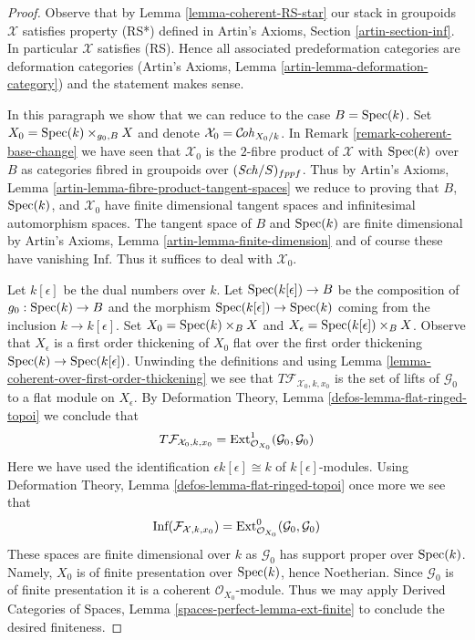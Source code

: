 \begin{proof}
Observe that by Lemma \ref{lemma-coherent-RS-star}
our stack in groupoids $\mathcal{X}$ satisfies property (RS*)
defined in Artin's Axioms, Section \ref{artin-section-inf}.
In particular $\mathcal{X}$ satisfies (RS).
Hence all associated predeformation
categories are deformation categories
(Artin's Axioms, Lemma \ref{artin-lemma-deformation-category})
and the statement makes sense.

\medskip\noindent
In this paragraph we show that we can reduce to the case $B = \mathop{\mathrm{Spec}}(k)$.
Set $X_0 = \mathop{\mathrm{Spec}}(k) \times_{g_0, B} X$
and denote $\mathcal{X}_0 = \mathcal{C}\!\mathit{oh}_{X_0/k}$. In
Remark \ref{remark-coherent-base-change} we have seen that
$\mathcal{X}_0$ is the $2$-fibre product of $\mathcal{X}$ with
$\mathop{\mathrm{Spec}}(k)$ over $B$ as categories fibred in groupoids over
$(\mathit{Sch}/S)_{fppf}$. Thus by
Artin's Axioms, Lemma \ref{artin-lemma-fibre-product-tangent-spaces}
we reduce to proving that $B$, $\mathop{\mathrm{Spec}}(k)$, and $\mathcal{X}_0$
have finite dimensional tangent spaces and infinitesimal automorphism
spaces. The tangent space of $B$ and $\mathop{\mathrm{Spec}}(k)$ are finite dimensional by
Artin's Axioms, Lemma \ref{artin-lemma-finite-dimension}
and of course these have vanishing $\text{Inf}$.
Thus it suffices to deal with $\mathcal{X}_0$.

\medskip\noindent
Let $k[\epsilon]$ be the dual numbers over $k$.
Let $\mathop{\mathrm{Spec}}(k[\epsilon]) \to B$ be the composition of $g_0 : \mathop{\mathrm{Spec}}(k) \to B$
and the morphism $\mathop{\mathrm{Spec}}(k[\epsilon]) \to \mathop{\mathrm{Spec}}(k)$
coming from the inclusion $k \to k[\epsilon]$.
Set $X_0 = \mathop{\mathrm{Spec}}(k) \times_B X$ and
$X_\epsilon = \mathop{\mathrm{Spec}}(k[\epsilon]) \times_B X$.
Observe that $X_\epsilon$ is a first order thickening of $X_0$
flat over the first order thickening $\mathop{\mathrm{Spec}}(k) \to \mathop{\mathrm{Spec}}(k[\epsilon])$.
Unwinding the definitions and using
Lemma \ref{lemma-coherent-over-first-order-thickening}
we see that $T\mathcal{F}_{\mathcal{X}_0, k, x_0}$ is the set of
lifts of $\mathcal{G}_0$ to a flat module on $X_\epsilon$.
By Deformation Theory, Lemma \ref{defos-lemma-flat-ringed-topoi}
we conclude that
$$
T\mathcal{F}_{\mathcal{X}_0, k, x_0} =
\mathop{\mathrm{Ext}}\nolimits^1_{\mathcal{O}_{X_0}}(\mathcal{G}_0, \mathcal{G}_0)
$$
Here we have used the identification $\epsilon k[\epsilon] \cong k$
of $k[\epsilon]$-modules. Using
Deformation Theory, Lemma \ref{defos-lemma-flat-ringed-topoi}
once more we see that
$$
\text{Inf}(\mathcal{F}_{\mathcal{X}, k, x_0}) =
\mathop{\mathrm{Ext}}\nolimits^0_{\mathcal{O}_{X_0}}(\mathcal{G}_0, \mathcal{G}_0)
$$
These spaces are finite dimensional over $k$ as $\mathcal{G}_0$
has support proper over $\mathop{\mathrm{Spec}}(k)$. Namely, $X_0$ is of finite presentation
over $\mathop{\mathrm{Spec}}(k)$, hence Noetherian. Since $\mathcal{G}_0$ is of finite
presentation it is a coherent $\mathcal{O}_{X_0}$-module. Thus we may apply
Derived Categories of Spaces, Lemma
\ref{spaces-perfect-lemma-ext-finite}
to conclude the desired finiteness.
\end{proof}


